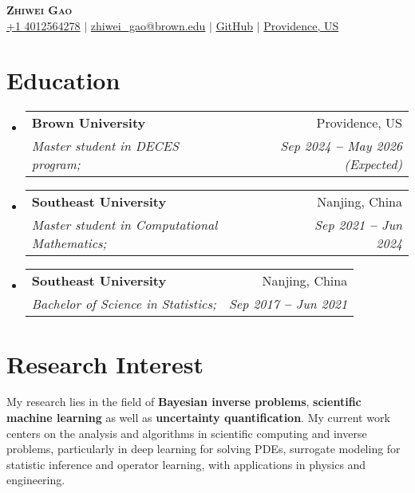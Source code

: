 \documentclass[letterpaper,11pt]{article}
\makeatletter
\newcommand{\resumeSubheading}[4]{
  \vspace{-2pt}\item
    \begin{tabular*}{0.97\textwidth}[t]{l@{\extracolsep{\fill}}r}
      \textbf{#1} & #2 \\
      \textit{\small#3} & \textit{\small #4} \\
    \end{tabular*}\vspace{-7pt}
}
\newcommand{\resumeEducationHeading}[4]{
  \vspace{-2pt}\item
    \begin{tabular*}{0.97\textwidth}[t]{l@{\extracolsep{\fill}}r}
      \textbf{#1} & #2 \\
      \textit{\small#3} & \textit{\small #4} \\
    \end{tabular*}\vspace{-5pt}
}
\newcommand{\resumeSubHeadingListStart}{\begin{itemize}[leftmargin=0.15in, label={}]}
\newcommand{\resumeSubHeadingListEnd}{\end{itemize}}
\makeatother
\begin{document}

\begin{center}
  \textbf{\Huge \scshape Zhiwei Gao} \\ \vspace{3pt}
  \small
  \faMobile \hspace{.5pt} \href{tel:4012564278}{+1 4012564278}
  $|$
  \faAt \hspace{.5pt} \href{mailto:zhiwei_gao@brown.edu}{zhiwei\_gao@brown.edu}
  $|$
  \faGithub \hspace{.5pt} \href{https://github.com/gaozhiweiPHD}{GitHub}
  $|$
  \faMapMarker \hspace{.5pt} \href{https://www.google.com/maps/search/brown+university/@41.8242463,-71.4135831,15z/data=!3m1!4b1?entry=ttu&g_ep=EgoyMDI0MTEwNi4wIKXMDSoASAFQAw%3D%3D}{Providence, US}
\end{center}




\section{Education}
  \vspace{3pt}
  \resumeSubHeadingListStart
  \resumeEducationHeading
  {Brown University
  }{Providence, US}
  {Master student in DECES program;}{Sep 2024 \textbf{--} May 2026 (Expected)}
    \resumeEducationHeading
      {Southeast University
      }{Nanjing, China}
      {Master student in Computational Mathematics;}{Sep 2021 \textbf{--} Jun 2024}
    \resumeSubheading
      {Southeast University
      }{Nanjing, China}
      {Bachelor of Science in Statistics; }{Sep 2017 \textbf{--} Jun 2021}
    
  \resumeSubHeadingListEnd




\section{Research Interest}
  \vspace{3pt}
  My research lies in the field of \textbf{\textbf{Bayesian inverse problems}}, \textbf{\textbf{scientific machine learning}} as well as \textbf{\textbf{uncertainty quantification}}. My current work centers on the analysis and algorithms in scientific computing and inverse problems, particularly in deep learning for solving PDEs, surrogate modeling for statistic inference and operator learning, with applications in physics and engineering.
\end{document}
